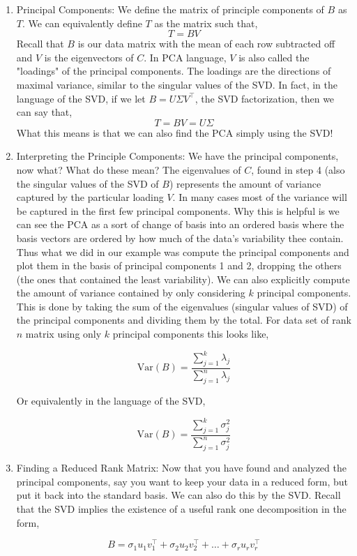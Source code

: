 \documentclass{article}
\begin{document}
\begin{enumerate}
\item Principal Components: We define the matrix of principle components of $B$ as $T$. We can equivalently define $T$ as the matrix such that,
$$T=BV$$
Recall that $B$ is our data matrix with the mean of each row subtracted off and $V$ is the eigenvectors of $C$. In PCA language, $V$ is also called the "loadings" of the principal components. The loadings are the directions of maximal variance, similar to the singular values of the SVD. In fact, in the language of the SVD, if we let $B=U\Sigma V^\top$, the SVD factorization, then we can say that,
$$T=BV=U\Sigma$$
What this means is that we can also find the PCA simply using the SVD!

\item Interpreting the Principle Components: We have the principal components, now what? What do these mean? The eigenvalues of $C$, found in step 4 (also the singular values of the SVD of $B$) represents the amount of variance captured by the particular loading $V$. In many cases most of the variance will be captured in the first few principal components. Why this is helpful is we can see the PCA as a sort of change of basis into an ordered basis where the basis vectors are ordered by how much of the data's variability thee contain. Thus what we did in our example was compute the principal components and plot them in the basis of principal components 1 and 2, dropping the others (the ones that contained the least variability). We can also explicitly compute the amount of variance contained by only considering $k$ principal components. This is done by taking the sum of the eigenvalues (singular values of SVD) of the principal components and dividing them by the total. For data set of rank $n$ matrix using only $k$ principal components this looks like,

$$\text{Var}(B)=\frac{\sum_{j=1}^{k}\lambda_j}{\sum_{j=1}^{n}\lambda_j}$$

Or equivalently in the language of the SVD,

$$\text{Var}(B)=\frac{\sum_{j=1}^{k}\sigma^2_j}{\sum_{j=1}^{n}\sigma^2_j}$$

\item Finding a Reduced Rank Matrix: Now that you have found and analyzed the principal components, say you want to keep your data in a reduced form, but put it back into the standard basis. We can also do this by the SVD. Recall that the SVD implies the existence of a useful rank one decomposition in the form,

$$B=\sigma_1u_1v^\top_1+\sigma_2u_2v^\top_2+\dots+\sigma_ru_rv^\top_r$$


\end{enumerate}
\end{document}
